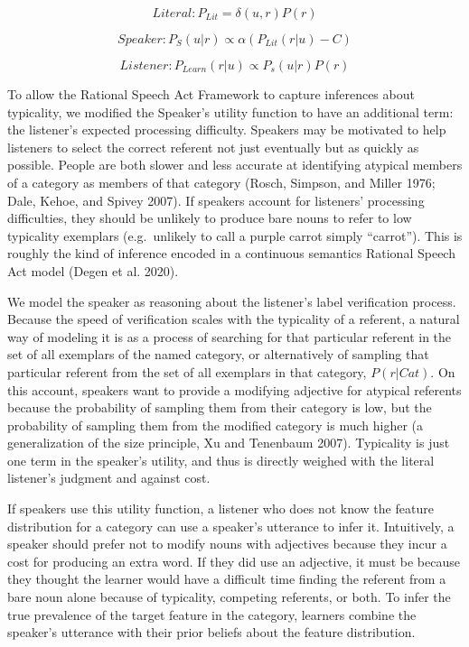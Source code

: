 \documentclass{ucetd}
\begin{document}
\[Literal: P_{Lit} = \delta\left(u,r\right)P\left(r\right)\]

\[Speaker: P_S\left(u \vert r\right) \propto \alpha \left(P_{Lit}\left(r \vert u\right) - C\right)\]

\[Listener: P_{Learn}\left(r \vert u\right) \propto P_s\left(u \vert r\right)P\left(r\right)\]

To allow the Rational Speech Act Framework to capture inferences about
typicality, we modified the Speaker's utility function to have an
additional term: the listener's expected processing difficulty. Speakers
may be motivated to help listeners to select the correct referent not
just eventually but as quickly as possible. People are both slower and
less accurate at identifying atypical members of a category as members
of that category (Rosch, Simpson, and Miller 1976; Dale, Kehoe, and
Spivey 2007). If speakers account for listeners' processing
difficulties, they should be unlikely to produce bare nouns to refer to
low typicality exemplars (e.g.~unlikely to call a purple carrot simply
``carrot''). This is roughly the kind of inference encoded in a
continuous semantics Rational Speech Act model (Degen et al. 2020).

We model the speaker as reasoning about the listener's label
verification process. Because the speed of verification scales with the
typicality of a referent, a natural way of modeling it is as a process
of searching for that particular referent in the set of all exemplars of
the named category, or alternatively of sampling that particular
referent from the set of all exemplars in that category,
\(P\left(r \vert Cat\right)\). On this account, speakers want to provide
a modifying adjective for atypical referents because the probability of
sampling them from their category is low, but the probability of
sampling them from the modified category is much higher (a
generalization of the size principle, Xu and Tenenbaum 2007). Typicality
is just one term in the speaker's utility, and thus is directly weighed
with the literal listener's judgment and against cost.

If speakers use this utility function, a listener who does not know the
feature distribution for a category can use a speaker's utterance to
infer it. Intuitively, a speaker should prefer not to modify nouns with
adjectives because they incur a cost for producing an extra word. If
they did use an adjective, it must be because they thought the learner
would have a difficult time finding the referent from a bare noun alone
because of typicality, competing referents, or both. To infer the true
prevalence of the target feature in the category, learners combine the
speaker's utterance with their prior beliefs about the feature
distribution.
\end{document}
